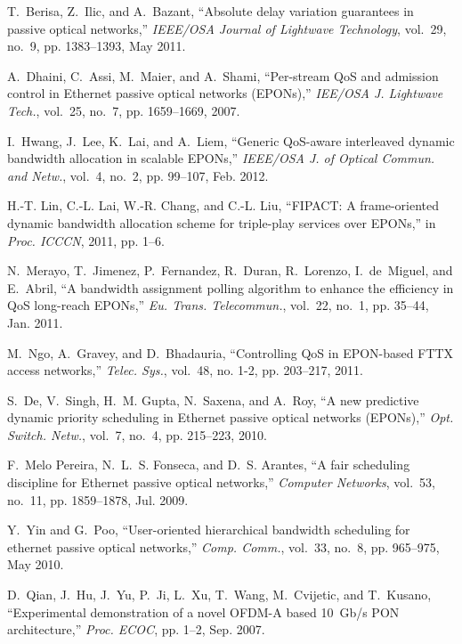 \documentclass[article]{IEEEtran}
\begin{document}
\begin{thebibliography}{100}
T.~Berisa, Z.~Ilic, and A.~Bazant, ``Absolute delay variation guarantees in
  passive optical networks,'' \emph{IEEE/OSA Journal of Lightwave Technology},
  vol.~29, no.~9, pp. 1383--1393, May 2011.

A.~Dhaini, C.~Assi, M.~Maier, and A.~Shami, ``Per-stream {QoS} and admission
  control in {Ethernet} passive optical networks {(EPONs)},'' \emph{IEE/OSA J.
  Lightwave Tech.}, vol.~25, no.~7, pp. 1659--1669, 2007.

I.~Hwang, J.~Lee, K.~Lai, and A.~Liem, ``Generic {QoS}-aware interleaved
  dynamic bandwidth allocation in scalable {EPONs},'' \emph{IEEE/OSA J. of
  Optical Commun. and Netw.}, vol.~4, no.~2, pp. 99--107, Feb. 2012.

H.-T. Lin, C.-L. Lai, W.-R. Chang, and C.-L. Liu, ``{FIPACT}: A frame-oriented
  dynamic bandwidth allocation scheme for triple-play services over {EPONs},''
  in \emph{Proc. ICCCN}, 2011, pp. 1--6.

N.~Merayo, T.~Jimenez, P.~Fernandez, R.~Duran, R.~Lorenzo, I.~de~Miguel, and
  E.~Abril, ``{A bandwidth assignment polling algorithm to enhance the
  efficiency in QoS long-reach EPONs},'' \emph{Eu. Trans. Telecommun.},
  vol.~22, no.~1, pp. 35--44, Jan. 2011.

M.~Ngo, A.~Gravey, and D.~Bhadauria, ``Controlling {QoS} in {EPON}-based {FTTX}
  access networks,'' \emph{Telec. Sys.}, vol.~48, no. 1-2, pp. 203--217, 2011.

S.~De, V.~Singh, H.~M. Gupta, N.~Saxena, and A.~Roy, ``A new predictive dynamic
  priority scheduling in {Ethernet} passive optical networks {(EPONs)},''
  \emph{Opt. Switch. Netw.}, vol.~7, no.~4, pp. 215--223, 2010.

F.~{Melo Pereira}, N.~L.~S. Fonseca, and D.~S. Arantes, ``A fair scheduling
  discipline for {Ethernet} passive optical networks,'' \emph{Computer
  Networks}, vol.~53, no.~11, pp. 1859--1878, Jul. 2009.

Y.~Yin and G.~Poo, ``User-oriented hierarchical bandwidth scheduling for
  ethernet passive optical networks,'' \emph{Comp. Comm.}, vol.~33, no.~8, pp.
  965--975, May 2010.

D.~Qian, J.~Hu, J.~Yu, P.~Ji, L.~Xu, T.~Wang, M.~Cvijetic, and T.~Kusano,
  ``Experimental demonstration of a novel {OFDM-A} based 10~{Gb/s} {PON}
  architecture,'' \emph{Proc. ECOC}, pp. 1--2, Sep. 2007.


\end{thebibliography}
\end{document}
